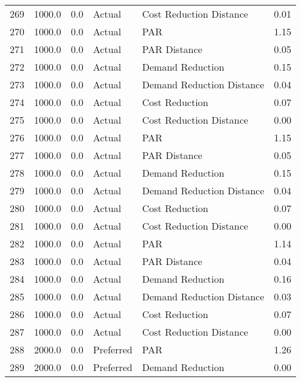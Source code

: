 \begin{longtable}{lrrllr}
269  &       1000.0 &     0.0 &         Actual &    Cost Reduction Distance &   0.01 \\
270  &       1000.0 &     0.0 &         Actual &                        PAR &   1.15 \\
271  &       1000.0 &     0.0 &         Actual &               PAR Distance &   0.05 \\
272  &       1000.0 &     0.0 &         Actual &           Demand Reduction &   0.15 \\
273  &       1000.0 &     0.0 &         Actual &  Demand Reduction Distance &   0.04 \\
274  &       1000.0 &     0.0 &         Actual &             Cost Reduction &   0.07 \\
275  &       1000.0 &     0.0 &         Actual &    Cost Reduction Distance &   0.00 \\
276  &       1000.0 &     0.0 &         Actual &                        PAR &   1.15 \\
277  &       1000.0 &     0.0 &         Actual &               PAR Distance &   0.05 \\
278  &       1000.0 &     0.0 &         Actual &           Demand Reduction &   0.15 \\
279  &       1000.0 &     0.0 &         Actual &  Demand Reduction Distance &   0.04 \\
280  &       1000.0 &     0.0 &         Actual &             Cost Reduction &   0.07 \\
281  &       1000.0 &     0.0 &         Actual &    Cost Reduction Distance &   0.00 \\
282  &       1000.0 &     0.0 &         Actual &                        PAR &   1.14 \\
283  &       1000.0 &     0.0 &         Actual &               PAR Distance &   0.04 \\
284  &       1000.0 &     0.0 &         Actual &           Demand Reduction &   0.16 \\
285  &       1000.0 &     0.0 &         Actual &  Demand Reduction Distance &   0.03 \\
286  &       1000.0 &     0.0 &         Actual &             Cost Reduction &   0.07 \\
287  &       1000.0 &     0.0 &         Actual &    Cost Reduction Distance &   0.00 \\
288  &       2000.0 &     0.0 &      Preferred &                        PAR &   1.26 \\
289  &       2000.0 &     0.0 &      Preferred &           Demand Reduction &   0.00 \\

\end{longtable}

